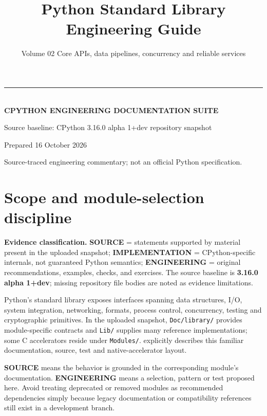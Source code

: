 \documentclass[
  11pt,
]{report}
\title{Python Standard Library Engineering Guide}
\subtitle{Volume 02 \textbar{} Core APIs, data pipelines, concurrency
and reliable services}
\author{}
\date{}
\makeatletter
\newcommand{\passthrough}[1]{#1}
\renewcommand{\maketitle}{%
  \hypersetup{pageanchor=false}%
\begin{titlepage}\pagecolor{CPNavy}\color{white}\sffamily
  \vspace*{0.8in}
  {\color{CPGold}\rule{2.1in}{4pt}}\\[16pt]
  {\Large\bfseries CPYTHON ENGINEERING DOCUMENTATION SUITE}\\[24pt]
  {\Huge\bfseries \@title\par}\vspace{19pt}
  \vfill
  {\normalsize Source baseline: CPython 3.16.0 alpha 1+dev repository snapshot}\par
  {\normalsize Prepared 16 October 2026}\par
  {\small\color{white!70} Source-traced engineering commentary; not an official Python specification.}\vspace{0.65in}
  \end{titlepage}\hypersetup{pageanchor=true}\nopagecolor\color{black}
  }
\makeatother
\begin{document}
\maketitle

{
\setcounter{tocdepth}{1}
\tableofcontents
}
\chapter{Scope and module-selection
discipline}\label{scope-and-module-selection-discipline}

\begin{sourcebox}
\textbf{Evidence classification.} \textbf{SOURCE} = statements supported by material present in the uploaded snapshot; \textbf{IMPLEMENTATION} = CPython-specific internals, not guaranteed Python semantics; \textbf{ENGINEERING} = original recommendations, examples, checks, and exercises. The source baseline is \textbf{3.16.0 alpha 1+dev}; missing repository file bodies are noted as evidence limitations.
\end{sourcebox}

Python's standard library exposes interfaces spanning data structures,
I/O, system integration, networking, formats, process control,
concurrency, testing and cryptographic primitives. In the uploaded
snapshot, \passthrough{\lstinline!Doc/library/!} provides
module-specific contracts and \passthrough{\lstinline!Lib/!} supplies
many reference implementations; some C accelerators reside under
\passthrough{\lstinline!Modules/!}.
 explicitly describes
this familiar documentation, source, test and native-accelerator layout.

\textbf{SOURCE} means the behavior is grounded in the corresponding
module's documentation. \textbf{ENGINEERING} means a selection, pattern
or test proposed here. Avoid treating deprecated or removed modules as
recommended dependencies simply because legacy documentation or
compatibility references still exist in a development branch.
\end{document}
